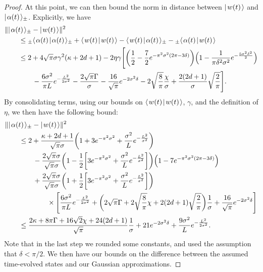 \documentclass[../thesis-main/thesis-main]{subfiles}
\begin{document}
\begin{proof}
At this point, we can then bound the norm in distance between $|\mspace{2mu} w(t) \mspace{2mu} \rangle$ and $|\mspace{2mu} \alpha(t) \mspace{2mu} \rangle_{\pm}$.  Explicitly, we have
\begin{align}
   &\|{|\mspace{2mu} \alpha(t) \mspace{2mu} \rangle_{\pm} - |\mspace{2mu} w(t) \mspace{2mu} \rangle}\|^2\nonumber\\
    &\qquad\leq {}_{\pm}\langle\mspace{2mu} \alpha(t) \mspace{2mu} | \mspace{2mu} \alpha(t)\mspace{2mu} \rangle_{\pm} + \langle\mspace{2mu} w(t) \mspace{2mu} | \mspace{2mu} w(t)\mspace{2mu} \rangle - \langle\mspace{2mu} w(t) \mspace{2mu} | \mspace{2mu} \alpha(t)\mspace{2mu} \rangle_{\pm} - {}_\pm \langle\mspace{2mu} \alpha(t) \mspace{2mu} | \mspace{2mu} w(t)\mspace{2mu} \rangle\\
    &\qquad \leq 2 + 4 \sqrt{\pi} \sigma \gamma^2(\kappa + 2d + 1)  - 2\eta\gamma\Bigg[ \bigg(\frac{1}{2} - \frac{7}{2}e^{-\pi^2\sigma^2(2\pi - 3\delta)}\bigg) \Big(1 - \frac{1}{\pi\delta^2 \sigma^2} e^{-\frac{5\sigma^2\delta^2}{2}} \Big) \nonumber\\
    &\qquad \qquad  - \frac{6\sigma^2}{\pi L} e^{-\frac{L^2}{2\sigma^2}} -  \frac{2\sqrt{\pi} \Gamma}{\sigma} - \frac{16}{\sqrt{\pi}} e^{-2\sigma^2 \delta} - 2\sqrt{ \frac{8}{\pi}} \frac{\chi}{\sigma} + \frac{2(2d+ 1)}{\sigma} \sqrt{\frac{2}{\pi}}\Bigg] .
\end{align}
By consolidating terms, using our bounds on $\langle\mspace{2mu} w(t) \mspace{2mu} | \mspace{2mu} w(t)\mspace{2mu} \rangle$, $\gamma$, and the definition of $\eta$, we then have the following bound: 
\begin{align}
  &\|{|\mspace{2mu} \alpha(t) \mspace{2mu} \rangle_{\pm} - |\mspace{2mu} w(t) \mspace{2mu} \rangle}\|^2\nonumber\\
    &\qquad\leq 2 + \frac{\kappa + 2d + 1}{\sqrt{\pi}\sigma} \bigg(1 + 3 e^{- \pi^2 \sigma^2} + \frac{\sigma^2}{L} e^{-\frac{L^2}{\sigma^2}} \bigg) \nonumber\\
    &\qquad \qquad - \frac{2 \sqrt{\pi} \sigma  }{\sqrt{\pi}\sigma} \bigg( 1 - \frac{1}{2} \bigg[3e^{-\pi^2\sigma^2} + \frac{\sigma^2}{L} e^{-\frac{L^2}{\sigma^2}} \bigg] \bigg) \Big(1 - 7 e^{-\pi^2\sigma^2(2\pi-3\delta)} \Big)\nonumber\\
    &\qquad \qquad + \frac{2\sqrt{\pi}\sigma}{\sqrt{\pi}{\sigma}}\bigg( 1 + \frac{1}{2} \bigg[3e^{-\pi^2\sigma^2} + \frac{\sigma^2}{L} e^{-\frac{L^2}{\sigma^2}} \bigg] \bigg) \nonumber\\
    &\qquad\qquad \qquad \times\Bigg[ \frac{6 \sigma^2}{\pi L} e^{-\frac{L^2}{2\sigma^2}} + \bigg(2\sqrt{\pi} \Gamma + 2 \sqrt{\frac{8}{\pi}} \chi + 2(2d+1) \sqrt{\frac{2}{\pi}} \bigg) \frac{1}{\sigma} + \frac{16}{\sqrt{\pi}} e^{-2\sigma^2 \delta}\Bigg]\\
    &\qquad \leq \frac{2\kappa + 8\pi \Gamma + 16\sqrt{2} \chi + 24(2d+1)}{\sqrt{\pi}} \frac{1}{\sigma} + 21 e^{-2\sigma^2 \delta} + \frac{9 \sigma^2}{L} e^{-\frac{L^2}{2\sigma^2}}.
\end{align}
Note that in the last step we rounded some constants, and used the assumption that $\delta < \pi/2$.  
We then have our bounds on the difference between the assumed time-evolved states and our Gaussian approximations.



\end{proof}
\end{document}
